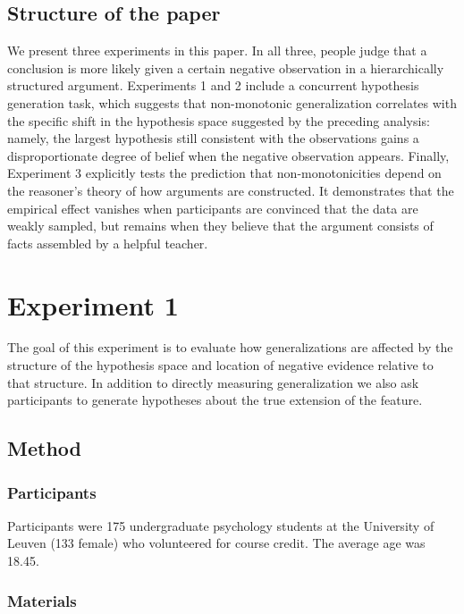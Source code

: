 \documentclass[authoryear,11pt]{elsarticle}
\begin{document}
\subsection{Structure of the paper}

We present three experiments in this paper. In all three, people judge that a conclusion is more likely given a certain negative observation in a hierarchically structured argument. Experiments 1 and 2 include a concurrent hypothesis generation task, which suggests that non-monotonic generalization correlates with the specific shift in the hypothesis space suggested by the preceding analysis: namely, the largest hypothesis still consistent with the observations gains a disproportionate degree of belief when the negative observation appears.
Finally, Experiment 3 explicitly tests the prediction that non-monotonicities depend on the reasoner's theory of how arguments are constructed. It demonstrates that the empirical effect vanishes when participants are convinced that the data are weakly sampled, but remains when they believe that the argument consists of facts assembled by a helpful teacher.

\section{Experiment 1}

The goal of this experiment is to evaluate how generalizations are affected by the structure of the hypothesis space and location of negative evidence relative to that structure. In addition to directly measuring generalization we also ask participants to generate hypotheses about the true extension of the feature.

\subsection{Method}
\subsubsection{Participants}

Participants were 175 undergraduate psychology students at the University of Leuven (133 female) who volunteered for course credit. The average age was 18.45.

\subsubsection{Materials}
\end{document}
